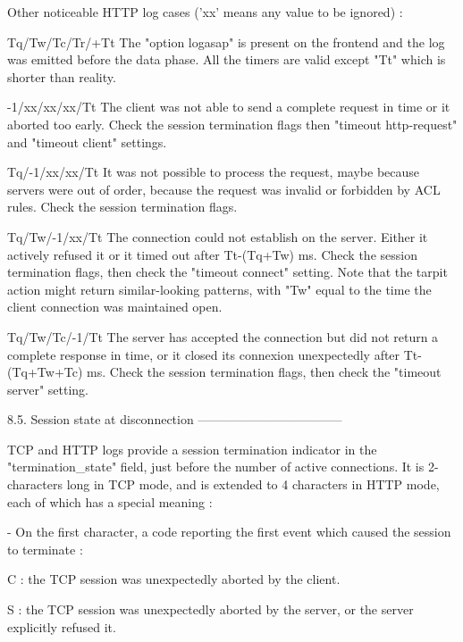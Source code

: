 Other noticeable HTTP log cases ('xx' means any value to be ignored) :

  Tq/Tw/Tc/Tr/+Tt  The "option logasap" is present on the frontend and the log
                   was emitted before the data phase. All the timers are valid
                   except "Tt" which is shorter than reality.

  -1/xx/xx/xx/Tt   The client was not able to send a complete request in time
                   or it aborted too early. Check the session termination flags
                   then "timeout http-request" and "timeout client" settings.

  Tq/-1/xx/xx/Tt   It was not possible to process the request, maybe because
                   servers were out of order, because the request was invalid
                   or forbidden by ACL rules. Check the session termination
                   flags.

  Tq/Tw/-1/xx/Tt   The connection could not establish on the server. Either it
                   actively refused it or it timed out after Tt-(Tq+Tw) ms.
                   Check the session termination flags, then check the
                   "timeout connect" setting. Note that the tarpit action might
                   return similar-looking patterns, with "Tw" equal to the time
                   the client connection was maintained open.

  Tq/Tw/Tc/-1/Tt   The server has accepted the connection but did not return
                   a complete response in time, or it closed its connexion
                   unexpectedly after Tt-(Tq+Tw+Tc) ms. Check the session
                   termination flags, then check the "timeout server" setting.


8.5. Session state at disconnection
-----------------------------------

TCP and HTTP logs provide a session termination indicator in the
"termination_state" field, just before the number of active connections. It is
2-characters long in TCP mode, and is extended to 4 characters in HTTP mode,
each of which has a special meaning :

  - On the first character, a code reporting the first event which caused the
    session to terminate :

        C : the TCP session was unexpectedly aborted by the client.

        S : the TCP session was unexpectedly aborted by the server, or the
            server explicitly refused it.

